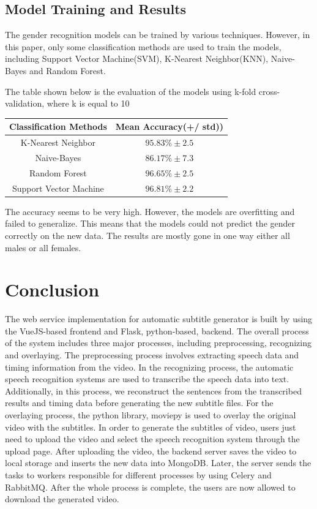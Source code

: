 \documentclass[natbib]{muthesis}
\begin{document}
 \section{Model Training and Results}
 The gender recognition models can be trained by various techniques. However, in this paper, only some classification methods are used to train the models, including Support Vector Machine(SVM), K-Nearest Neighbor(KNN), Naive-Bayes and Random Forest.
 
 The table shown below is the evaluation of the models using k-fold cross-validation, where k is equal to 10
 \begin{center}
  \begin{tabular}{ |c|c| } 
 	\hline
 	Classification Methods& Mean Accuracy(+/ std)) \\ 
 	\hline
 	K-Nearest Neighbor & $95.83\% \pm 2.5 $\\
 	Naive-Bayes & $86.17\% \pm 7.3 $\\
 	Random Forest & $96.65\% \pm 2.5 $\\
 	Support Vector Machine & $96.81\% \pm 2.2 $\\
 	
 	\hline
  \end{tabular}
 \end{center}
 The accuracy seems to be very high. However, the models are overfitting and failed to generalize. This means that the models could not predict the gender correctly on the new data. The results are mostly gone in one way either all males or all females.
 
 \chapter{Conclusion}

 The web service implementation for automatic subtitle generator is built by using the VueJS-based frontend and Flask, python-based, backend. The overall process of the system includes three major processes, including preprocessing, recognizing and overlaying. The preprocessing process involves extracting speech data and timing information from the video. In the recognizing process, the automatic speech recognition systems are used to transcribe the speech data into text. Additionally, in this process, we reconstruct the sentences from the transcribed results and timing data before generating the new subtitle files. For the overlaying process, the python library, moviepy is used to overlay the original video with the subtitles. In order to generate the subtitles of video, users just need to upload the video and select the speech recognition system through the upload page. After uploading the video, the backend server saves the video to local storage and inserts the new data into MongoDB. Later, the server sends the tasks to workers responsible for different processes by using Celery and RabbitMQ. After the whole process is complete, the users are now allowed to download the generated video.
 
\end{document}

